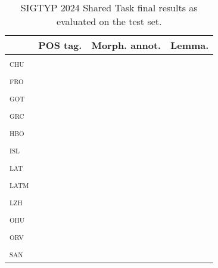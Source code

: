 \documentclass{../acl_latex.tex}
\begin{document}
\begin{table}[t]
\centering
\begin{tabular}{lrrr}
\toprule
                 & POS tag. & Morph. annot. & Lemma. \\ \midrule
\textsc{chu}     &          &               &        \\ 
\textsc{fro}     &          &               &        \\
\textsc{got}     &          &               &        \\
\textsc{grc}     &          &               &        \\
\textsc{hbo}     &          &               &        \\
\textsc{isl}     &          &               &        \\
\textsc{lat}     &          &               &        \\
\textsc{latm}    &          &               &        \\
\textsc{lzh}     &          &               &        \\
\textsc{ohu}     &          &               &        \\
\textsc{orv}     &          &               &        \\
\textsc{san}     &          &               &        \\ \bottomrule 
\end{tabular}
\caption{
    SIGTYP 2024 Shared Task final results as evaluated on the test set.
}
\label{table:main_results}
\end{table}
\end{document}

